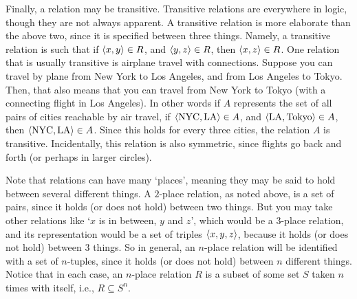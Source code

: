 Finally, a relation may be transitive. Transitive relations are everywhere in logic, though they are not always apparent. A transitive relation is more elaborate than the above two, since it is specified between three things. Namely, a transitive relation is such that if $\langle x, y\rangle \in R$, and $\langle y, z\rangle \in R$, then $\langle x, z\rangle \in R$. One relation that is usually transitive is airplane travel with connections. Suppose you can travel by plane from New York to Los Angeles, and from Los Angeles to Tokyo. Then, that also means that you can travel from New York to Tokyo (with a connecting flight in Los Angeles). In other words if $A$ represents the set of all pairs of cities reachable by air travel, if $\langle\text{NYC}, \text{LA}\rangle \in A$, and $\langle\text{LA}, \text{Tokyo}\rangle \in A$, then $\langle\text{NYC}, \text{LA}\rangle \in A$. Since this holds for every three cities, the relation $A$ is transitive. Incidentally, this relation is also symmetric, since flights go back and forth (or perhaps in larger circles).  


Note that relations can have many `places', meaning they may be said to hold between several different things. A $2$-place relation, as noted above, is a set of pairs, since it holds (or does not hold) between two things. But you may take other relations like `$x$ is in between, $y$ and $z$', which would be a $3$-place relation, and its representation would be a set of triples $\langle x, y, z\rangle$, because it holds (or does not hold) between 3 things. So in general, an $n$-place relation will be identified with a set of $n$-tuples, since it holds (or does not hold) between $n$ different things. Notice that in each case, an $n$-place relation $R$ is a subset of some set $S$ taken $n$ times with itself, i.e., $R \subseteq S^n$. 

